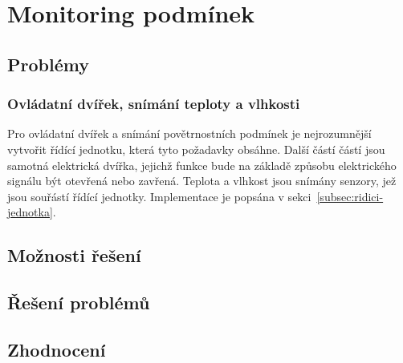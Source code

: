 \section{Monitoring podmínek}\label{sec:monitoring-podminek}
\subsection{Problémy}\label{subsec:monitoring-podminek-problemy}
\subsubsection{Ovládatní dvířek, snímání teploty a vlhkosti}
Pro ovládatní dvířek a snímání povětrnostních podmínek je nejrozumnější vytvořit řídící jednotku, která tyto požadavky obsáhne.
Další částí částí jsou samotná elektrická dvířka, jejichž funkce bude na základě způsobu elektrického signálu být otevřená nebo zavřená.
Teplota a vlhkost jsou snímány senzory, jež jsou souřástí řídící jednotky.
Implementace je popsána v sekci~\ref{subsec:ridici-jednotka}.
\subsection{Možnosti řešení}\label{subsec:monitoring-podminek-moznosti-reseni}
\subsection{Řešení problémů}\label{subsec:monitoring-podminek-reseni-problemu}
\subsection{Zhodnocení}\label{subsec:monitoring-podminek-zhodnoceni}